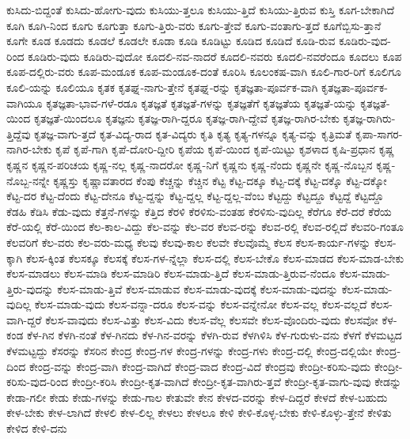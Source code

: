 {ಕುಸಿದು-ಬಿದ್ದಂತೆ
ಕುಸಿದು-ಹೋಗು-ವುದು
ಕುಸಿಯು-ತ್ತಲೂ
ಕುಸಿಯು-ತ್ತಿದೆ
ಕುಸಿಯು-ತ್ತಿರುವ
ಕುಸ್ತಿ
ಕೂಗ-ಬೇಕಾಗಿದೆ
ಕೂಗಿ
ಕೂಗಿ-ನಿಂದ
ಕೂಗು
ಕೂಗುತ್ತಾ
ಕೂಗು-ತ್ತಿರು-ವರು
ಕೂಗು-ತ್ತೇವೆ
ಕೂಗು-ವಂತಾಗು-ತ್ತದೆ
ಕೂಗೆಬ್ಬಿಸು-ತ್ತಾನೆ
ಕೂಗೇ
ಕೂಡ
ಕೂಡದು
ಕೂಡಲೆ
ಕೂಡಲೇ
ಕೂಡಾ
ಕೂಡಿ
ಕೂಡಿಟ್ಟು
ಕೂಡಿದ
ಕೂಡಿದೆ
ಕೂಡಿ-ರುವ
ಕೂಡಿರು-ವುದ-ರಿಂದ
ಕೂಡಿರು-ವುದು
ಕೂಡಿರು-ವುದೋ
ಕೂದಲಿ-ನವ-ನಾದರೆ
ಕೂದಲಿ-ನವರು
ಕೂದಲಿ-ನವರೆಂದೂ
ಕೂದಲು
ಕೂಪ
ಕೂಪ-ದಲ್ಲಿರು-ವರು
ಕೂಪ-ಮಂಡೂಕ
ಕೂಪ-ಮಂಡೂಕ-ದಂತೆ
ಕೂರಿಸಿ
ಕೂಲಂಕಷ-ವಾಗಿ
ಕೂಲಿ-ಗಾರ-ರಿಗೆ
ಕೂಲಿಗೂ
ಕೂಲಿ-ಯನ್ನು
ಕೂಲಿಯೂ
ಕೃತಕ
ಕೃತಘ್ನ-ನಾಗು-ತ್ತೇನೆ
ಕೃತಘ್ನ-ರನ್ನು
ಕೃತಜ್ಞತಾ-ಪೂರ್ವಕ-ವಾಗಿ
ಕೃತಜ್ಞತಾ-ಪೂರ್ವಕ-ವಾಗಿಯೂ
ಕೃತಜ್ಞತಾ-ಭಾವ-ಗಳೆ-ರಡೂ
ಕೃತಜ್ಞತೆ
ಕೃತಜ್ಞತೆ-ಗಳನ್ನು
ಕೃತಜ್ಞತೆಗೆ
ಕೃತಜ್ಞತೆಯ
ಕೃತಜ್ಞತೆ-ಯನ್ನು
ಕೃತಜ್ಞತೆ-ಯಿಂದ
ಕೃತಜ್ಞತೆ-ಯಿಂದಲೂ
ಕೃತಜ್ಞನು
ಕೃತಜ್ಞ-ರಾಗಿ-ದ್ದರೂ
ಕೃತಜ್ಞ-ರಾಗಿ-ದ್ದೇವೆ
ಕೃತಜ್ಞ-ರಾಗಿರ-ಬೇಕು
ಕೃತಜ್ಞ-ರಾಗಿರು-ತ್ತಿದ್ದೆವು
ಕೃತಜ್ಞ-ವಾಗು-ತ್ತದೆ
ಕೃತ-ವಿದ್ಯ-ರಾದ
ಕೃತ-ವಿದ್ಯರು
ಕೃತಿ
ಕೃತ್ಯ
ಕೃತ್ಯ-ಗಳನ್ನೂ
ಕೃತ್ಯ-ವನ್ನು
ಕೃತ್ರಿಮತೆ
ಕೃಪಾ-ಸಾಗರ-ನಾಗಿರ-ಬೇಕು
ಕೃಪೆ
ಕೃಪೆ-ಗಾಗಿ
ಕೃಪೆ-ದೋರಿ-ದ್ದೀರಿ
ಕೃಪೆಯ
ಕೃಪೆ-ಯಿಂದ
ಕೃಪೆ-ಯಿಟ್ಟು
ಕೃಶಳಾದ
ಕೃಷಿ-ಪ್ರಧಾನ
ಕೃಷ್ಣ
ಕೃಷ್ಣನ
ಕೃಷ್ಣನ-ಪರಿಚಯ
ಕೃಷ್ಣ-ನಲ್ಲ
ಕೃಷ್ಣ-ನಾದರೋ
ಕೃಷ್ಣ-ನಿಗೆ
ಕೃಷ್ಣನು
ಕೃಷ್ಣ-ನೆಂದು
ಕೃಷ್ಣನೇ
ಕೃಷ್ಣ-ನೊಬ್ಬನ
ಕೃಷ್ಣ-ನೊಬ್ಬ-ನನ್ನೇ
ಕೃಷ್ಣಸ್ತು
ಕೃಷ್ಣಾವತಾರದ
ಕೆಂಪು
ಕೆಚ್ಚನ್ನು
ಕೆಚ್ಚಿನ
ಕೆಟ್ಟ
ಕೆಟ್ಟ-ದಕ್ಕೂ
ಕೆಟ್ಟ-ದಕ್ಕೆ
ಕೆಟ್ಟ-ದಕ್ಕೊ
ಕೆಟ್ಟ-ದಕ್ಕೋ
ಕೆಟ್ಟ-ದರ
ಕೆಟ್ಟ-ದೆಂದು
ಕೆಟ್ಟ-ದೇನೂ
ಕೆಟ್ಟ-ದ್ದನ್ನು
ಕೆಟ್ಟ-ದ್ದಲ್ಲ
ಕೆಟ್ಟ-ದ್ದಲ್ಲ-ವೆಂಬ
ಕೆಟ್ಟದ್ದು
ಕೆಟ್ಟದ್ದೂ
ಕೆಟ್ಟದ್ದೆ
ಕೆಟ್ಟದ್ದೊ
ಕೆಡಹಿ
ಕೆಡಿಸಿ
ಕೆಡು-ವುದು
ಕೆತ್ತನೆ-ಗಳನ್ನು
ಕೆತ್ತಿದ
ಕೆರಳಿ
ಕೆರಳಿಸು-ವಂತಹ
ಕೆರಳಿಸು-ವುದಿಲ್ಲ
ಕೆರೆಗೂ
ಕೆರೆ-ದರೆ
ಕೆರೆಯ
ಕೆರೆ-ಯಲ್ಲಿ
ಕೆರೆ-ಯಿಂದ
ಕೆಲ-ಕಾಲ-ವಿದ್ದು
ಕೆಲ-ವನ್ನು
ಕೆಲ-ವರ
ಕೆಲವ-ರನ್ನು
ಕೆಲವ-ರಲ್ಲಿ
ಕೆಲವ-ರಲ್ಲಿದೆ
ಕೆಲವರಿ-ಗಂತೂ
ಕೆಲವರಿಗೆ
ಕೆಲ-ವರು
ಕೆಲ-ವರು-ಮಧ್ಯ
ಕೆಲವು
ಕೆಲವು-ಕಾಲ
ಕೆಲವೇ
ಕೆಲವೊಮ್ಮೆ
ಕೆಲಸ
ಕೆಲಸ-ಕಾರ್ಯ-ಗಳನ್ನು
ಕೆಲಸ-ಕ್ಕಾಗಿ
ಕೆಲಸ-ಕ್ಕಿಂತ
ಕೆಲಸಕ್ಕೂ
ಕೆಲಸಕ್ಕೆ
ಕೆಲಸ-ಗಳ-ನ್ನೆಲ್ಲಾ
ಕೆಲಸ-ದಲ್ಲಿ
ಕೆಲಸ-ಬೇಕೊ
ಕೆಲಸ-ಮಾಡದ
ಕೆಲಸ-ಮಾಡ-ಬೇಕು
ಕೆಲಸ-ಮಾಡಲು
ಕೆಲಸ-ಮಾಡಿ
ಕೆಲಸ-ಮಾಡಿರಿ
ಕೆಲಸ-ಮಾಡು-ತ್ತಿದೆ
ಕೆಲಸ-ಮಾಡು-ತ್ತಿರುವ-ನೆಂದೂ
ಕೆಲಸ-ಮಾಡು-ತ್ತಿರು-ವುದನ್ನು
ಕೆಲಸ-ಮಾಡು-ತ್ತಿವೆ
ಕೆಲಸ-ಮಾಡುವ
ಕೆಲಸ-ಮಾಡು-ವುದಕ್ಕೆ
ಕೆಲಸ-ಮಾಡು-ವುದನ್ನು
ಕೆಲಸ-ಮಾಡು-ವುದಿಲ್ಲ
ಕೆಲಸ-ಮಾಡು-ವುದು
ಕೆಲಸ-ವನ್ನಾ-ದರೂ
ಕೆಲಸ-ವನ್ನು
ಕೆಲಸ-ವನ್ನೇನೋ
ಕೆಲಸ-ವಲ್ಲ
ಕೆಲಸ-ವಲ್ಲದೆ
ಕೆಲಸ-ವಾಗಿ-ದ್ದರೆ
ಕೆಲಸ-ವಾವುದು
ಕೆಲಸ-ವಿತ್ತು
ಕೆಲಸ-ವಿದು
ಕೆಲಸ-ವೆಲ್ಲ
ಕೆಲಸವೇ
ಕೆಲಸ-ವೊಂದಿರು-ವುದು
ಕೆಲಸವೋ
ಕೆಳ-ಕಂಡ
ಕೆಳ-ಗಿನ
ಕೆಳಗಿ-ನಂತೆ
ಕೆಳ-ಗಿನದು
ಕೆಳ-ಗಿನ-ವರನ್ನು
ಕೆಳಗಿ-ರುವ
ಕೆಳಗಿಳಿಸಿ
ಕೆಳ-ಗುರುಳು-ವನು
ಕೆಳಗೆ
ಕೆಳಮಟ್ಟದ
ಕೆಳಮಟ್ಟದ್ದು
ಕೆಸರನ್ನು
ಕೆಸರಿನ
ಕೇಂದ್ರ
ಕೇಂದ್ರ-ಗಳ
ಕೇಂದ್ರ-ಗಳನ್ನು
ಕೇಂದ್ರ-ಗಳು
ಕೇಂದ್ರ-ದಲ್ಲಿ
ಕೇಂದ್ರ-ದಲ್ಲಿಯೇ
ಕೇಂದ್ರ-ದಿಂದ
ಕೇಂದ್ರ-ವನ್ನು
ಕೇಂದ್ರ-ವಾಗಿ
ಕೇಂದ್ರ-ವಾಗಿದೆ
ಕೇಂದ್ರ-ವಾದ
ಕೇಂದ್ರ-ವಿದೆ
ಕೇಂದ್ರವು
ಕೇಂದ್ರೀ-ಕರಿಸು-ವುದು
ಕೇಂದ್ರೀ-ಕರಿಸು-ವುದ-ರಿಂದ
ಕೇಂದ್ರೀ-ಕರಿಸಿ
ಕೇಂದ್ರೀ-ಕೃತ-ವಾಗಿದೆ
ಕೇಂದ್ರೀ-ಕೃತ-ವಾಗಿರು-ತ್ತವೆ
ಕೇಂದ್ರೀ-ಕೃತ-ವಾಗು-ವುವು
ಕೇಡನ್ನು
ಕೇಡಾ-ಗಲೀ
ಕೇಡು
ಕೇಡು-ಗಳನ್ನು
ಕೇಡು-ಗಾಲ
ಕೇತುವೇ
ಕೇನ
ಕೇಳದ-ವರನ್ನು
ಕೇಳ-ದಿದ್ದರೆ
ಕೇಳದೆ
ಕೇಳ-ಬಹುದು
ಕೇಳ-ಬೇಕು
ಕೇಳ-ಲಾಗಿದೆ
ಕೇಳಲಿ
ಕೇಳ-ಲಿಲ್ಲ
ಕೇಳಲು
ಕೇಳಲೂ
ಕೇಳಿ
ಕೇಳಿ-ಕೊಳ್ಳ-ಬೇಕು
ಕೇಳಿ-ಕೊಳ್ಳು-ತ್ತೇನೆ
ಕೇಳಿತು
ಕೇಳಿದ
ಕೇಳಿ-ದನು
}
